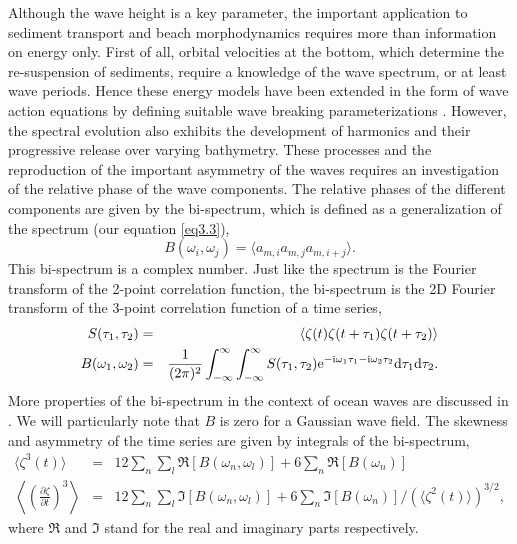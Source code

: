 Although the wave height is a key parameter, the important application to sediment transport and beach morphodynamics requires 
more than information on energy only. First of all, orbital velocities at the bottom, which determine the re-suspension of 
sediments, require a knowledge of the wave spectrum, or at least wave periods. Hence these energy models have been 
extended in the form of wave action equations by defining suitable wave breaking parameterizations 
\citep[e.g.][]{Filipot&Ardhuin2012}. However, the spectral evolution also exhibits the development of harmonics 
and their progressive release over varying bathymetry. These processes 
and the reproduction of the important asymmetry of the waves requires an investigation of the relative phase of 
the wave components.
The relative phases of the different components are given by the 
bi-spectrum, which is defined as a generalization of the spectrum (our equation \ref{eq3.3}), 
\begin{equation}
B(\omega_i,\omega_j) = \langle a_{m,i} a_{m,j} a_{m,i+j} \rangle. 
\label{eq:bispecdef}
\end{equation}
This bi-spectrum is a complex number. Just like the spectrum is the Fourier transform of the 
2-point correlation function, the bi-spectrum  is the 2D Fourier transform of the 3-point correlation 
function of a time series, 
\begin{eqnarray}
S(\tau_1,\tau_2)&=& \langle \zeta(t) \zeta(t+\tau_1) \zeta(t+\tau_2)\rangle \\
B(\omega_1,\omega_2)&=& \frac{1}{(2 \pi)^2} \int_{-\infty}^\infty \int_{-\infty}^\infty S(\tau_1,\tau_2)
\mathrm{e}^{-\mathrm{i} \omega_1 \tau_1  -\mathrm{i} \omega_2 \tau_2 } \mathrm{d}\tau_1   \mathrm{d}\tau_2.
\end{eqnarray}
More properties of the bi-spectrum in the context of ocean waves are discussed in \cite{Hasselmann&al.1963}. 
We will particularly note that $B$ is zero for a Gaussian wave field. The skewness and asymmetry of the 
time series are given by integrals of the bi-spectrum, 
\begin{eqnarray}
 \langle  \zeta^3(t)\rangle &=& 12 \sum_n \sum_l \Re\left[ B(\omega_n,\omega_l)\right] + 6 \sum_n \Re\left[ B(\omega_n)\right] \\
\left\langle  \left(\frac{\partial \zeta}{\partial t}\right)^3 \right\rangle &=& 12 \sum_n \sum_l \Im\left[ B(\omega_n,\omega_l)\right] 
 + 6 \sum_n \Im\left[ B(\omega_n)\right]/ \left(\langle \zeta^2(t)\rangle\right)^{3/2},
\end{eqnarray}
where $\Re$ and $\Im$ stand for the real and imaginary parts respectively. 

